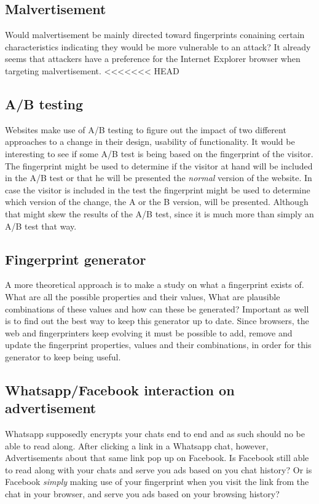 \subsection{Malvertisement}

Would malvertisement be mainly directed toward
fingerprints conaining certain characteristics
indicating they would be more vulnerable to an attack?
It already seems that attackers have a preference
for the Internet Explorer browser
when targeting malvertisement.
<<<<<<< HEAD
\citep{li2012knowing}

\subsection{A/B testing}
Websites make use of A/B testing to figure out the impact
of two different approaches to a change
in their design, usability of functionality.
It would be interesting to see if some A/B test
is being based on the fingerprint of the visitor.
The fingerprint might be used to determine
if the visitor at hand will be included in the A/B test
or that he will be presented the \emph{normal} version of the website.
In case the visitor is included in the test
the fingerprint might be used to determine which version of the change,
the A or the B version, will be presented.
Although that might skew the results of the A/B test,
since it is much more than simply an A/B test that way.

\subsection{Fingerprint generator}
A more theoretical approach is to make a study on what a fingerprint exists of.
What are all the possible properties and their values,
What are plausible combinations of these values
and how can these be generated?
Important as well is to find out the best way
to keep this generator up to date.
Since browsers, the web and fingerprinters keep evolving
it must be possible to add, remove and update
the fingerprint properties, values and their combinations,
in order for this generator to keep being useful.

\subsection{Whatsapp/Facebook interaction on advertisement}
Whatsapp supposedly encrypts your chats end to end
and as such should no be able to read along.
After clicking a link in a Whatsapp chat, however,
Advertisements about that same link pop up on Facebook.
Is Facebook still able to read along with your chats
and serve you ads based on you chat history?
Or is Facebook \emph{simply} making use of your fingerprint
when you visit the link from the chat in your browser,
and serve you ads based on your browsing history?

